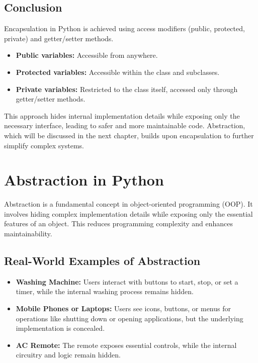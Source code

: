 \section{Conclusion}

Encapsulation in Python is achieved using access modifiers (public, protected, private) and getter/setter methods.  

\begin{itemize}
    \item \textbf{Public variables:} Accessible from anywhere.
    \item \textbf{Protected variables:} Accessible within the class and subclasses.
    \item \textbf{Private variables:} Restricted to the class itself, accessed only through getter/setter methods.
\end{itemize}

This approach hides internal implementation details while exposing only the necessary interface, leading to safer and more maintainable code. Abstraction, which will be discussed in the next chapter, builds upon encapsulation to further simplify complex systems.

\chapter{Abstraction in Python}

Abstraction is a fundamental concept in object-oriented programming (OOP). It involves hiding complex implementation details while exposing only the essential features of an object. This reduces programming complexity and enhances maintainability.

\section{Real-World Examples of Abstraction}

\begin{itemize}
    \item \textbf{Washing Machine:} Users interact with buttons to start, stop, or set a timer, while the internal washing process remains hidden.
    \item \textbf{Mobile Phones or Laptops:} Users see icons, buttons, or menus for operations like shutting down or opening applications, but the underlying implementation is concealed.
    \item \textbf{AC Remote:} The remote exposes essential controls, while the internal circuitry and logic remain hidden.
\end{itemize}


